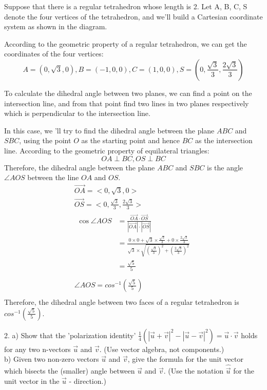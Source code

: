 \documentclass{article}
\begin{document}
Suppose that there is a regular tetrahedron whose length is 2. Let A, B, C, S 
denote the four vertices of the tetrahedron, and we'll build a Cartesian 
coordinate system as shown in the diagram.

According to the geometric property of a regular tetrahedron, we can get 
the coordinates of the four vertices:
\[ A = (0, \sqrt{3}, 0), B = (-1, 0, 0), C = (1, 0, 0), S = (0, \frac{\sqrt{3}}{3}, \frac{2\sqrt{3}}{3})\]

To calculate the dihedral angle between two planes, we can find a point on the 
intersection line, and from that point find two lines in two planes respectively 
which is perpendicular to the intersection line. 

In this case, we 'll try to find the dihedral angle between the plane $ABC$ and 
$SBC$, using the point $O$ as the starting point and hence $BC$ as the 
intersection line. According to the geometric property of equilateral triangles:
\[ OA \perp BC, OS \perp BC \]
Therefore, the dihedral angle between the plane $ABC$ and $SBC$ is the angle 
$\angle{AOS}$ between the line $OA$ and $OS$.
\begin{gather*}
  \vec{OA} = <0, \sqrt{3}, 0> \\
  \vec{OS} = <0, \frac{\sqrt{3}}{3}, \frac{2\sqrt{3}}{3}> \\
  \begin{split}
    \cos\angle{AOS} &= \frac{\vec{OA} \cdot \vec{OS}}{|\vec{OA}| \cdot |\vec{OS}|} \\
                    &= \frac{0 \times 0 + \sqrt{3} \times \frac{\sqrt{3}}{3} + 0 \times \frac{2\sqrt{3}}{3}}{\sqrt{3} \times \sqrt{(\frac{\sqrt{3}}{3})^2 + (\frac{2\sqrt{3}}{3})^2}} \\
                    &= \frac{\sqrt{5}}{5} \\
  \end{split} \\
  \angle{AOS} = cos^{-1}(\frac{\sqrt{5}}{5}) \\
\end{gather*}
Therefore, the dihedral angle between two faces of a regular tetrahedron is 
$cos^{-1}(\frac{\sqrt{5}}{5})$.

2. a) Show that the 'polarization identity'
$\frac{1}{4}(|\vec{u} + \vec{v}|^{2} - |\vec{u} - \vec{v}|^{2}) = \vec{u} \cdot \vec{v}$ 
holds for any two n-vectors $\vec{u}$ and $\vec{v}$. (Use vector algebra, not 
components.) \\
b) Given two non-zero vectors $\vec{u}$ and $\vec{v}$, give the formula for the
unit vector which bisects the (smaller) angle between $\vec{u}$ and $\vec{v}$.
(Use the notation $\hat{\vec{u}}$ for the unit vector in the $\vec{u}$ -
direction.)
\end{document}
